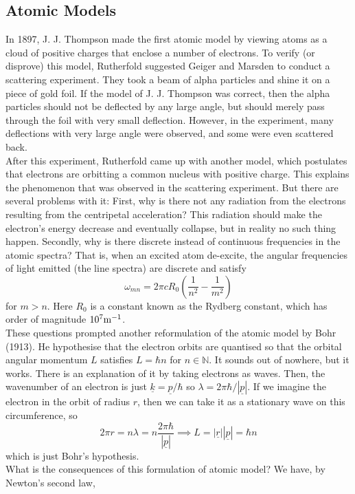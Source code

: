 \subsection{Atomic Models}
In 1897, J. J. Thompson made the first atomic model by viewing atoms as a cloud of positive charges that enclose a number of electrons.
To verify (or disprove) this model, Rutherfold suggested Geiger and Marsden to conduct a scattering experiment.
They took a beam of alpha particles and shine it on a piece of gold foil.
If the model of J. J. Thompson was correct, then the alpha particles should not be deflected by any large angle, but should merely pass through the foil with very small deflection.
However, in the experiment, many deflections with very large angle were observed, and some were even scattered back.\\
After this experiment, Rutherfold came up with another model, which postulates that electrons are orbitting a common nucleus with positive charge.
This explains the phenomenon that was observed in the scattering experiment.
But there are several problems with it:
First, why is there not any radiation from the electrons resulting from the centripetal acceleration?
This radiation should make the electron's energy decrease and eventually collapse, but in reality no such thing happen.
Secondly, why is there discrete instead of continuous frequencies in the atomic spectra?
That is, when an excited atom de-excite, the angular frequencies of light emitted (the line spectra) are discrete and satisfy
$$\omega_{mn}=2\pi cR_0\left( \frac{1}{n^2}-\frac{1}{m^2} \right)$$
for $m>n$.
Here $R_0$ is a constant known as the Rydberg constant, which has order of magnitude $10^7{\rm m^{-1}}$.\\
These questions prompted another reformulation of the atomic model by Bohr (1913).
He hypothesise that the electron orbits are quantised so that the orbital angular momentum $L$ satisfies $L=\hbar n$ for $n\in\mathbb N$.
It sounds out of nowhere, but it works.
There is an explanation of it by taking electrons as waves.
Then, the wavenumber of an electron is just $\underline{k}=\underline{p}/\hbar$ so $\lambda=2\pi\hbar/|\underline{p}|$.
If we imagine the electron in the orbit of radius $r$, then we can take it as a stationary wave on this circumference, so
$$2\pi r=n\lambda=n\frac{2\pi\hbar}{|\underline{p}|}\implies L=|\underline{r}||\underline{p}|=\hbar n$$
which is just Bohr's hypothesis.\\
What is the consequences of this formulation of atomic model?
We have, by Newton's second law,
